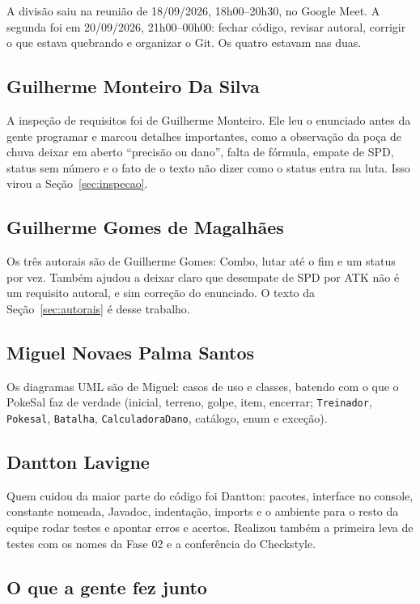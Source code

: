 \documentclass[12pt,oneside,a4paper,article]{abntex2}
\begin{document}
A divisão saiu na reunião de 18/09/2026, 18h00--20h30, no Google Meet. A
segunda foi em 20/09/2026, 21h00--00h00: fechar código, revisar autoral,
corrigir o que estava quebrando e organizar o Git. Os quatro estavam nas
duas.

\subsection{Guilherme Monteiro Da Silva}

A inspeção de requisitos foi de Guilherme Monteiro. Ele leu o enunciado
antes da gente programar e marcou detalhes importantes, como a observação da poça de chuva deixar em aberto ``precisão ou dano'', falta de
fórmula, empate de SPD, status sem número e o fato de o texto não dizer
como o status entra na luta. Isso virou a Seção~\ref{sec:inspecao}.

\subsection{Guilherme Gomes de Magalhães}

Os três autorais são de Guilherme Gomes: Combo, lutar até o fim e um status
por vez. Também ajudou a deixar claro que desempate de SPD por ATK não
é um requisito autoral, e sim correção do enunciado. O texto da Seção~\ref{sec:autorais} é
desse trabalho.

\subsection{Miguel Novaes Palma Santos}

Os diagramas UML são de Miguel: casos de uso e classes, batendo com o
que o PokeSal faz de verdade (inicial, terreno, golpe, item, encerrar;
\texttt{Treinador}, \texttt{Pokesal}, \texttt{Batalha},
\texttt{CalculadoraDano}, catálogo, enum e exceção).

\subsection{Dantton Lavigne}

Quem cuidou da maior parte do código foi Dantton: pacotes, interface no console, constante
nomeada, Javadoc, indentação, imports e o ambiente para o
resto da equipe rodar testes e apontar erros e acertos. Realizou também a primeira leva de testes com os nomes da
Fase 02 e a conferência do Checkstyle.

\subsection{O que a gente fez junto}
\end{document}
